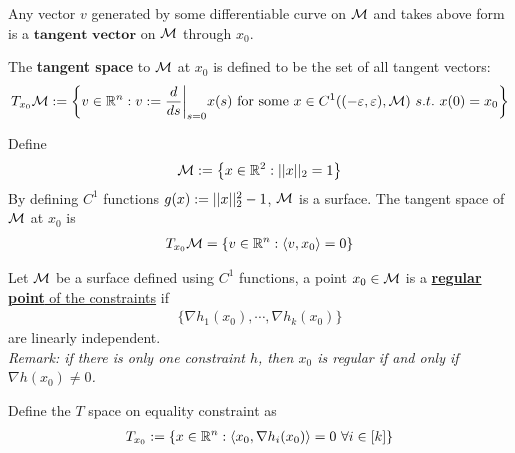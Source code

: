 \documentclass{article}
\begin{document}
   	\begin{definition}
   		Any vector $v$ generated by some differentiable curve on $\mathcal{{M}}$ and takes above form is a $\textbf{tangent vector}$ on $\mathcal{{M}}$ through $x_0$.
   	\end{definition}
   	
   	\begin{definition}
   		The \textbf{tangent space} to $\mathcal{{M}}$ at $x_0$ is defined to be the set of all tangent vectors:
   		\begin{align}
   			T_{x_0} \mathcal{{M}} := \left \{
   			v \in \mathbb{R}^n
   			:
   			v := \frac{d}{ds} \bigg \vert_{s=0} x(s) \text{{ for some }} x \in C^1((-\varepsilon, \varepsilon), \mathcal{{M}})\ s.t.\ x(0) = x_0
   			\right \}
   		\end{align}
   	\end{definition}
   	
   	\begin{example}
   		Define 
   		\begin{align}
   			\mathcal{{M}} := \left\{x \in \mathbb{R}^2: \vert \vert {x} \vert \vert_2 = 1 \right\}
   		\end{align}
   		By defining $C^1$ functions $g(x) := \vert \vert {x} \vert \vert^2_2  - 1$, $\mathcal{{M}}$ is a surface. The tangent space of $\mathcal{{M}}$ at $x_0$ is
   		\begin{align}
   			T_{x_0} \mathcal{{M}} = \left \{
   			v \in \mathbb{R}^n:
   			\langle {v}, {x_0} \rangle = 0
   			\right \}
   		\end{align}
   	\end{example}
   	
   	\begin{definition}
   		Let $\mathcal{{M}}$ be a surface defined using $C^1$ functions, a point $x_0 \in \mathcal{{M}}$ is a \ul{\textbf{regular point} of the constraints} if 
   		\begin{align}
   			\{\nabla h_1(x_0), \cdots, \nabla h_k(x_0)\}
   		\end{align}
   		are linearly independent. \\
   		\emph{Remark: if there is only one constraint $h$, then $x_0$ is regular if and only if $\nabla h(x_0) \neq 0$.}
   	\end{definition}
   	
   	\begin{notation}
   		Define the $T$ space on equality constraint as
   		\begin{align}
   			T_{x_0} := \{x \in \R^n: \inner{x_0}{\nabla h_i(x_0)} = 0\ \forall i \in [k]\}
   		\end{align}
   	\end{notation}
   	
\end{document}
